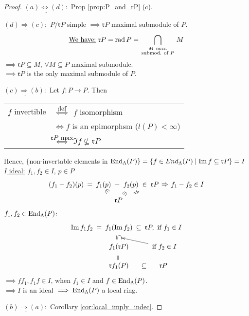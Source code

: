 \begin{proof}
$\underline{(a) \iff (d):}$ Prop \ref{prop:P_and_rP} (c).

$\underline{(d) \Rightarrow (c):}$ $P/\mathfrak{r}P$ simple $\implies \mathfrak{r}P$ maximal submodule of $P$.\\
$$\text{\underline{We have:} } \mathfrak{r}P = \operatorname{rad}\nolimits P = \bigcap_{\begin{smallmatrix} M \text{ max.} \\ \text{submod. of } P\end{smallmatrix}} M$$
$\implies \mathfrak{r}P \subseteq M$, $\forall M \subseteq P$ maximal submodule.\\
$\implies \mathfrak{r}P$ is the only maximal submodule of $P$.

$\underline{(c) \Rightarrow (b):}$ Let $f: P \to P$. Then\\ \begin{tabular}{cl}
$f$ invertible &$\stackrel{\mathclap{\normalfont\mbox{def}}}{\iff}$ $f$ isomorphism\\
&$\iff f$ is an epimorphsm ($l(P) < \infty$)\\
&$\stackrel{\mathclap{\normalfont\mbox{$\mathfrak{r}P$ max}}}{\iff}$ $\Im f \not\subseteq \mathfrak{r}P$
\end{tabular}
Hence, $\{ $non-invertable elements in $\operatorname{End}_\Lambda(P) \} = \{ f \in End_\Lambda(P) \mid \operatorname{Im}\nolimits f \subseteq \mathfrak{r}P \} = I$\\
\underline{$I$ ideal:} $f_1, f_2 \in I$, $p \in P$
\[\xy
\xymatrix"eq"@C-1pc{
(f_1-f_2)(p) \ar@{}[r]|-*[@]{=} & f_1(p) \ar@{}[r]|-*[@]{-} & f_2(p) \ar@{}[r]|-*[@]{\in} & \mathfrak{r}P \ar@{}[r]|-*[@]{\Rightarrow} & f_1-f_2 \in I
}
\POS(27, -8)
\xymatrix{
\mathfrak{r}P \ar@{}["eq"r]|-*[@]{\ni} \ar@{}["eq"rr]|-*[@]{\ni} \ar@{}["eq"rrr]|-*[@]{\Rightarrow}
}
\endxy\]
$f_1, f_2 \in \operatorname{End}_\Lambda(P)$:
\[\xymatrix@R-1pc@C-1pc{
\Im f_1f_2 \ar@{}[r]|-*[@]{=} & f_1(\Im f_2) \ar@{}[r]|-*[@]{\subseteq} \ar@{}[d]|-*[@]{\subseteq}="ar" & \mathfrak{r}P, \text{ if } f_1 \in I\\
           & f_1(\mathfrak{r}P) \ar@{}[d]|-*[@]{=} & \text{ if } f_2 \in I \ar"ar"\\
           & \mathfrak{r}f_1(P) \ar@{}[r]|-*[@]{\subseteq} & \mathfrak{r}P
}\]
$\implies ff_1, f_1f \in I$, when $f_1 \in I$ and $f \in \operatorname{End}_\Lambda(P)$.\\
$\implies I$ is an ideal $\implies \operatorname{End}_\Lambda(P)$ a local ring.

$\underline{(b) \Rightarrow (a):}$ Corollary \ref{cor:local_imply_indec}.
\end{proof}


